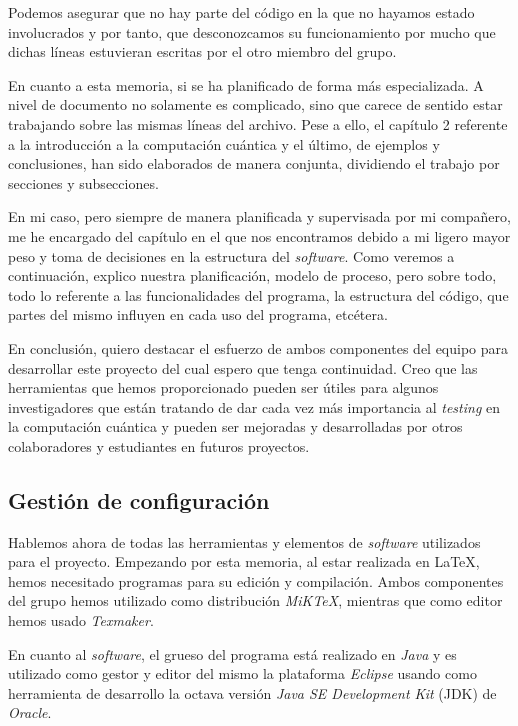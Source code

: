 Podemos asegurar que no hay parte del código en la que no hayamos estado involucrados y por tanto, que desconozcamos su funcionamiento por mucho que dichas líneas estuvieran escritas por el otro miembro del grupo.

En cuanto a esta memoria, si se ha planificado de forma más especializada. A nivel de documento no solamente es complicado, sino que carece de sentido estar trabajando sobre las mismas líneas del archivo. Pese a ello, el capítulo 2 referente a la introducción a la computación cuántica y el último, de ejemplos y conclusiones, han sido elaborados de manera conjunta, dividiendo el trabajo por secciones y subsecciones.

En mi caso, pero siempre de manera planificada y supervisada por mi compañero, me he encargado del capítulo en el que nos encontramos debido a mi ligero mayor peso y toma de decisiones en la estructura del \textit{software}. Como veremos a continuación, explico nuestra planificación, modelo de proceso, pero sobre todo, todo lo referente a las funcionalidades del programa, la estructura del código, que partes del mismo influyen en cada uso del programa, etcétera.

En conclusión, quiero destacar el esfuerzo de ambos componentes del equipo para desarrollar este proyecto del cual espero que tenga continuidad. Creo que las herramientas que hemos proporcionado pueden ser útiles para algunos investigadores que están tratando de dar cada vez más importancia al \textit{testing} en la computación cuántica y pueden ser mejoradas y desarrolladas por otros colaboradores y estudiantes en futuros proyectos.

\subsection{Gestión de configuración}

Hablemos ahora de todas las herramientas y elementos de \textit{software} utilizados para el proyecto. Empezando por esta memoria, al estar realizada en \LaTeX, hemos necesitado programas para su edición y compilación. Ambos componentes del grupo hemos utilizado como distribución \textit{MiKTeX}, mientras que como editor hemos usado \textit{Texmaker}.

En cuanto al \textit{software}, el grueso del programa está realizado en \textit{Java} y es utilizado como gestor y editor del mismo la plataforma \textit{Eclipse} usando como herramienta de desarrollo la octava versión \textit{Java SE Development Kit} (JDK) de \textit{Oracle}.

